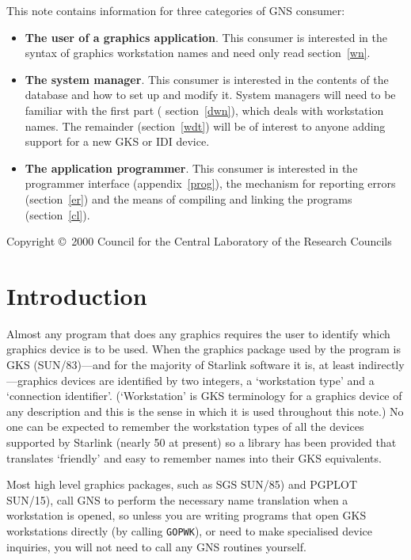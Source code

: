 \documentclass[twoside,11pt]{article}
\newcommand{\stardocinitials}  {SUN}
\newcommand{\stardoccopyright}
{Copyright \copyright\ 2000 Council for the Central Laboratory of the Research Councils}
\newcommand{\stardocnumber}    {57.9}
\newcommand{\stardocabstract}  {
This note contains information for three categories of GNS consumer:

\begin{itemize}

\item {\bf The user of a graphics application}. This consumer is interested in
the syntax of graphics workstation names and need only read
\hyperref{this section}{section~}{}{wn}.

\item {\bf The system manager}. This consumer is interested in the contents
of the database and how to set up and modify it. System managers will need to
be familiar with the first part (
\hyperref{this section}{section~}{}{dwn}), which deals with
workstation names. The remainder
(\hyperref{this section}{section~}{}{wdt}) will be of interest to
anyone adding support for a new GKS or IDI device.

\item {\bf The application programmer}. This consumer is interested in the
programmer interface
(\hyperref{this appendix}{appendix~}{}{prog}), the mechanism for reporting
errors
(\hyperref{this section}{section~}{}{er}) and the means of compiling and linking the
programs (\hyperref{this section}{section~}{}{cl}).

\end{itemize}
}
\newcommand{\stardocname}{\stardocinitials /\stardocnumber}
\newcommand{\hyperref}[4]{#2\ref{#4}#3}
\newenvironment{latexonly}{}{}
\newcommand{\xref}[3]{#1}
\renewcommand{\_}{\texttt{\symbol{95}}}
\renewcommand{\thepage}{\roman{page}}
\begin{document}
\stardocabstract

\begin{latexonly}
\newpage
\vspace*{\fill}
\stardoccopyright
\end{latexonly}

  \newpage
  \begin{latexonly}
    \setlength{\parskip}{0mm}
    \tableofcontents
    \setlength{\parskip}{\medskipamount}
    \markboth{\stardocname}{\stardocname}
  \end{latexonly}

\cleardoublepage
\renewcommand{\thepage}{\arabic{page}}
\setcounter{page}{1}

\section{Introduction}\label{in}

Almost any program that does any graphics requires the user to identify which
graphics device is to be used. When the graphics package used by the program is
GKS (\xref{SUN/83}{sun83}{})---and for the majority of Starlink
software it is, at least indirectly---graphics devices are
identified by two integers, a `workstation type' and a `connection
identifier'. (`Workstation' is GKS terminology for a graphics device of any
description and this is the sense in which it is used throughout this
note.) No one can be expected to remember the workstation types of all the
devices supported by Starlink (nearly 50 at present) so a library has been
provided that translates `friendly' and easy to remember names into their GKS
equivalents.

Most high level graphics packages, such as SGS \xref{SUN/85}{sun85}{})
and PGPLOT \xref{SUN/15}{sun15}{}), call GNS to
perform the necessary name translation when a workstation is opened, so
unless you are writing programs that open GKS workstations directly
(by calling {\tt GOPWK}), or need to make specialised device inquiries,
you will not need to call any GNS routines yourself.
\end{document}
